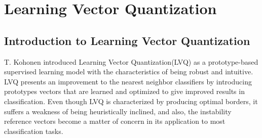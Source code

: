 
\chapter{Learning Vector Quantization}

\section{Introduction to Learning Vector Quantization}
T. Kohonen introduced Learning Vector Quantization(LVQ) as a prototype-based supervised learning model with the characteristics of being robust and intuitive\cite{kohonen2001learning}. LVQ presents an improvement to the nearest neighbor classifiers by introducing prototypes vectors that are learned and optimized to give improved results in classification\cite{kaden2014aspects}. Even though LVQ is characterized by producing optimal borders, it suffers a weakness of being heuristically inclined, and also, the instability reference vectors become a matter of concern in its application to most classification tasks\cite{kohonen2001learning,article}.


